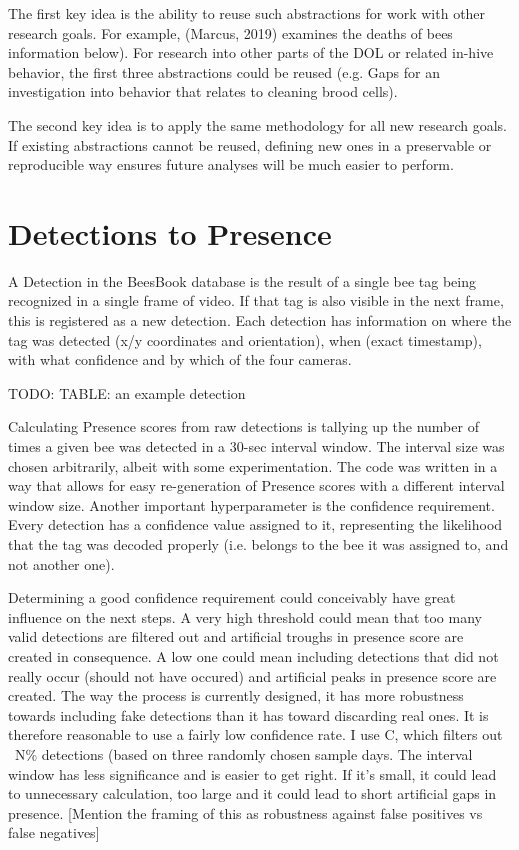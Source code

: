 The first key idea is the ability to reuse such abstractions for work with
other research goals. For example, (Marcus, 2019) examines the deaths of bees %
information below). For research into other parts of the DOL or related in-hive
behavior, the first three abstractions could be reused (e.g. Gaps
for an investigation into behavior that relates to cleaning brood cells). 

The second key idea is to apply the same methodology for all new research goals.
If existing abstractions cannot be reused, defining new ones in a preservable or 
reproducible way ensures future analyses will be much easier to perform.  



\section{Detections to Presence}
A Detection in the BeesBook database is the result of a single bee tag being
recognized in a single frame of video. If that tag is also visible in the next
frame, this is registered as a new detection. Each detection has information on
where the tag was detected (x/y coordinates and orientation), when (exact
timestamp), with what confidence and by which of the four cameras. 

TODO: TABLE: an example detection

Calculating Presence scores from raw detections is tallying up the number of
times a given bee was detected in a 30-sec interval window. The interval size
was chosen arbitrarily, albeit with some experimentation. The code was written
in a way that allows for easy re-generation of Presence scores with a different
interval window size. Another important hyperparameter is the confidence
requirement. Every detection has a confidence value assigned to it, representing
the likelihood that the tag was decoded properly (i.e. belongs to the bee it was
assigned to, and not another one).

Determining a good confidence requirement could conceivably have great influence
on the next steps. A very high threshold could mean that too many valid
detections are filtered out and artificial troughs in presence score are created
in consequence. A low one could mean including detections that did not really
occur (should not have occured) and artificial peaks in presence score are
created. The way the process is currently designed, it has more robustness
towards including fake detections than it has toward discarding real ones. It is
therefore reasonable to use a fairly low confidence rate. I use C, which filters
out ~N\% detections (based on three randomly chosen sample days. The interval
window has less significance and is easier to get right. If it’s small, it could
lead to unnecessary calculation, too large and it could lead to short artificial
gaps in presence. [Mention the framing of this as robustness against false
positives vs false negatives]

